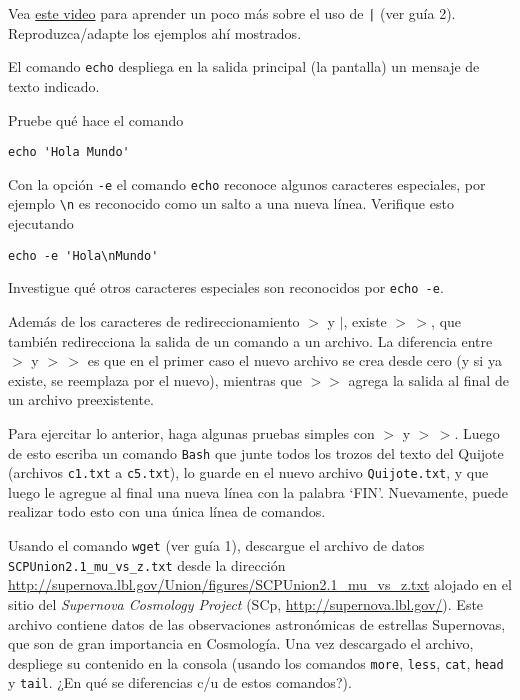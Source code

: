 \documentclass[11pt]{exam}
\begin{document}
\begin{questions}


\item Vea \href{https://youtu.be/VSH1XpWN1us}{este video} para aprender un poco más sobre el uso de \texttt{|} (ver guía 2). Reproduzca/adapte los ejemplos ahí mostrados.

\item El comando \texttt{echo} despliega en la salida principal (la pantalla) un mensaje de texto indicado.
\begin{parts}
\item Pruebe qué hace el comando 
\begin{verbatim}
echo 'Hola Mundo'
\end{verbatim}
\item Con la opción \texttt{-e} el comando \texttt{echo} reconoce algunos caracteres especiales, por ejemplo \verb|\n| es reconocido como un salto a una nueva línea. Verifique esto ejecutando
\begin{verbatim}
echo -e 'Hola\nMundo'
\end{verbatim}
\item Investigue qué otros caracteres especiales son reconocidos por \texttt{echo -e}.
\end{parts}

\item Además de los caracteres de redireccionamiento $>$ y $\vert$, existe $>\,>$, que también redirecciona la salida de un comando a un archivo. La diferencia entre $>$ y $>\,>$ es que en el primer caso el nuevo archivo se crea desde cero (y si ya existe, se reemplaza por el nuevo), mientras que $>>$ agrega la salida al final de un archivo preexistente.

Para ejercitar lo anterior, haga algunas pruebas simples con $>$ y $>\,>$. Luego de esto escriba un comando \texttt{Bash} que junte todos los trozos del texto del Quijote (archivos \texttt{c1.txt} a \texttt{c5.txt}), lo guarde en el nuevo archivo \texttt{Quijote.txt},   y que luego le agregue al final una nueva línea con la palabra `FIN'. Nuevamente, puede realizar todo esto con una única línea de comandos.

\item Usando el comando \texttt{wget} (ver guía 1), descargue el archivo de datos \verb|SCPUnion2.1_mu_vs_z.txt| desde la dirección \url{http://supernova.lbl.gov/Union/figures/SCPUnion2.1_mu_vs_z.txt} alojado en el sitio del \textit{Supernova Cosmology Project} (SCp,
\url{http://supernova.lbl.gov/}). Este archivo contiene datos de las observaciones astronómicas de estrellas Supernovas, que son de gran importancia en Cosmología. Una vez descargado el archivo, despliege su contenido en la consola (usando los comandos \texttt{more}, \texttt{less}, \texttt{cat}, \texttt{head} y \texttt{tail}. ¿En qué se diferencias c/u de estos comandos?).


\end{questions}
\end{document}
